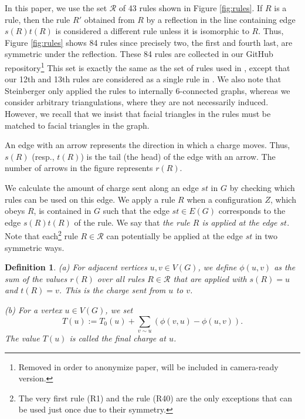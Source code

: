 \documentclass[10pt,a4paper]{article}
\newtheorem{dfn}[thm]{Definition}
\newcommand\drop[1]{}
\def\showlabel#1{}
\begin{document}
In this paper, we use the set $\mathcal{R}$ of 43 rules shown in Figure \ref{fig:rules}.
If $R$ is a rule, then the rule $R'$ obtained from $R$ by a reflection in the line containing edge $s(R)t(R)$ is considered a different rule unless it is isomorphic to $R$. Thus, Figure \ref{fig:rules} shows 84 rules since precisely two, the first and fourth last, are symmetric under the reflection.
These 84 rules are collected in our GitHub repository\footnote{Removed in order to anonymize paper, will be included in camera-ready version.\drop{\url{https://github.com/near-linear-4ct/discharging-rules}}}
This set is exactly the same as the set of rules used in \cite{steinberger2010unavoidable}, except that our 12th and 13th rules are considered as a single rule in \cite{steinberger2010unavoidable}. We also note that Steinberger only applied the rules to internally 6-connected graphs, whereas we consider arbitrary triangulations, where they are not necessarily induced. However, we recall that we insist that facial triangles in the rules must be matched to facial triangles in the graph.




An edge with an arrow represents the direction in which a charge moves. Thus, $s(R)$ (resp., $t(R)$) is the tail (the head) of the edge with an arrow.
The number of arrows in the figure represents $r(R)$.

We calculate the amount of charge sent along an edge $st$ in $G$ by checking which rules can be used on this edge.
We apply a rule $R$ when a configuration $Z$, which obeys $R$, is contained in $G$ such that the edge $st\in E(G)$ corresponds to the edge $s(R)t(R)$ of the rule. We say that \emph{the rule $R$ is applied at the edge $st$}.
Note that each\footnote{The very first rule (R1) and the rule (R40) are the only exceptions that can be used just once due to their symmetry.} rule $R\in \mathcal{R}$ can potentially be applied at the edge $st$ in two symmetric ways.


\begin{dfn}
\label{dfn:amount}\showlabel{dfn:amount}
  (a) For adjacent vertices $u, v \in V(G)$, we define $\phi(u,v)$ as the sum of the values $r(R)$ over all rules $R\in \mathcal{R}$ that are applied with $s(R) = u$ and $t(R) = v$. This is the \emph{charge sent from $u$ to $v$}.

\label{dfn:finalcharge}\showlabel{dfn:finalcharge}
  (b) For a vertex $u \in V(G)$, we set
    \[
      T(u) := T_0(u) + \sum_{v \sim u} (\phi(v, u) - \phi(u,v)).
    \]
    The value $T(u)$ is called the \emph{final charge} at $u$.
\end{dfn}
\end{document}
